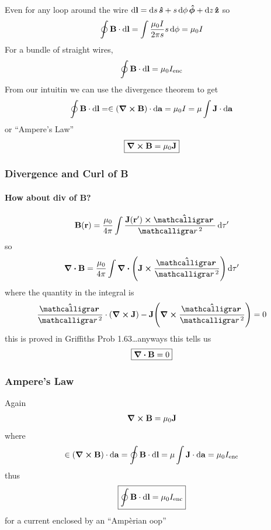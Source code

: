 \documentclass[../main.tex]{subfiles}
\begin{document}
Even for any loop around the wire $\dd{\vb l} = \dd{s} \vu*{s} + s \dd{\phi} \vu*{\phi} + \dd{z} \vu{z}$ so
\begin{align*}
    \oint \vb B \cdot \dd{\vb l} = \int \frac{\mu_0 I}{2\pi s} s \dd{\phi} = \mu_0 I
\end{align*}
For a bundle of straight wires,
\begin{align*}
    \oint \vb B \cdot \dd{\vb l} = \mu_0 I_\text{enc}
\end{align*}
From our intuitin we can use the divergence theorem to get
\begin{align*}
    \oint \vb B \cdot \dd{\vb l} = \in (\curl \vb B) \cdot \dd{\vb a} = \mu_0 I = \mu \int \vb J \cdot \dd{\vb a}
\end{align*}
or ``Ampere's Law''
\begin{align*}
    \boxed{
        \curl \vb B = \mu_0 \vb J
    }
\end{align*}

\subsubsection{Divergence and Curl of B}
\paragraph{How about div of B?}
\begin{align*}
    \vb B (\vb r) = \frac{\mu_0}{4\pi} \int \frac{\vb J (\vb r') \cross \vu*{\scriptr}}{\scriptr^2} \dd{\tau'}
\end{align*}
so 
\begin{align*}
    \div \vb B = \frac{\mu_0}{4\pi} \int \div \qt(\vb J \cross \frac{\vu*{\scriptr}}{\scriptr^2}) \dd{\tau'}
\end{align*}
where the quantity in the integral is
\begin{align*}
    \frac{\vu*{\scriptr}}{\scriptr^2} \cdot (\curl \vb J) - \vb J \qt(\curl \frac{\vu*{\scriptr}}{\scriptr^2}) = 0 
\end{align*}
this is proved in Griffiths Prob 1.63\dots anyways this tells us
\begin{align*}
    \boxed{
        \div \vb B = 0
    }
\end{align*}

\subsubsection{Ampere's Law}
Again
\begin{align*}
    \curl \vb B = \mu_0 \vb J
\end{align*}
where
\begin{align*}
    \in (\curl \vb B) \cdot \dd{\vb a}  = \oint \vb B \cdot \dd{\vb l} = \mu \int \vb J \cdot \dd{\vb a} = \mu_0 I_\text{enc}
\end{align*}
thus
\begin{align*}
    \boxed{
        \oint \vb B \cdot \dd{\vb l} = \mu_0 I_\text{enc}
    }
\end{align*}
for a current enclosed by an ``Amp\`erian oop''
\end{document}
